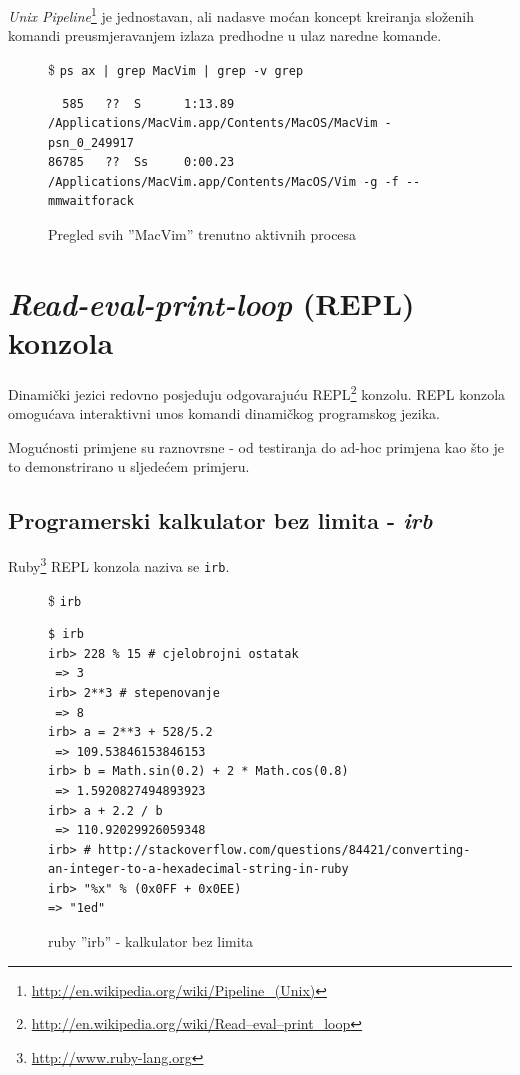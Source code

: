 \documentclass[times, utf8, seminar]{fit}
\begin{document}
\emph{Unix Pipeline}\footnote{\url{http://en.wikipedia.org/wiki/Pipeline_(Unix)}} je jednostavan, ali nadasve moćan koncept kreiranja složenih komandi preusmjeravanjem izlaza predhodne u ulaz naredne komande.

\begin{figure}[H]
\$ \verb+ps ax | grep MacVim | grep -v grep+
\begin{lstlisting}
  585   ??  S      1:13.89 /Applications/MacVim.app/Contents/MacOS/MacVim -psn_0_249917
86785   ??  Ss     0:00.23 /Applications/MacVim.app/Contents/MacOS/Vim -g -f --mmwaitforack
\end{lstlisting}

\caption{Pregled svih ''MacVim'' trenutno aktivnih procesa}
\end{figure}


\section{\emph{Read-eval-print-loop} (REPL) konzola}

Dinamički jezici redovno posjeduju odgovarajuću REPL\footnote{\url{http://en.wikipedia.org/wiki/Read–eval–print_loop}} konzolu.
REPL konzola omogućava interaktivni unos komandi dinamičkog programskog jezika.

Mogućnosti primjene su raznovrsne - od testiranja do ad-hoc primjena kao što je to demonstrirano u sljedećem primjeru.

\subsection{Programerski kalkulator bez limita - \emph{irb}}

Ruby\footnote{\url{http://www.ruby-lang.org}} REPL konzola naziva se \verb+irb+. 


\begin{figure}[H]
\$ \verb+irb+

\begin{lstlisting}
$ irb
irb> 228 % 15 # cjelobrojni ostatak
 => 3 
irb> 2**3 # stepenovanje
 => 8 
irb> a = 2**3 + 528/5.2
 => 109.53846153846153 
irb> b = Math.sin(0.2) + 2 * Math.cos(0.8)
 => 1.5920827494893923 
irb> a + 2.2 / b
 => 110.92029926059348
irb> # http://stackoverflow.com/questions/84421/converting-an-integer-to-a-hexadecimal-string-in-ruby
irb> "%x" % (0x0FF + 0x0EE) 
=> "1ed" 

\end{lstlisting}

\caption{ruby ''irb'' - kalkulator bez limita}
\end{figure}
\end{document}

